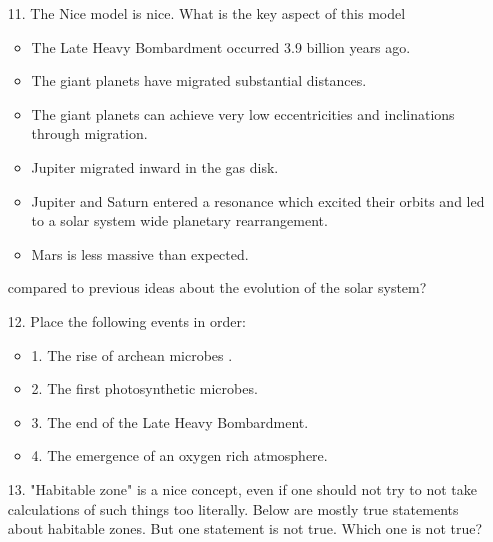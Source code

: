 \begin{enumerate}
    \item[11.] The Nice model is nice. What is the key aspect of this model 
    
    \begin{itemize}[label={$\bullet$}]
        \item The Late Heavy Bombardment occurred 3.9 billion years ago.
        \item The giant planets have migrated substantial distances.
        \item The giant planets can achieve very low eccentricities and inclinations through migration.
        \item Jupiter migrated inward in the gas disk.
        \item Jupiter and Saturn entered a resonance which excited  their orbits and led to a solar system wide planetary rearrangement.
        \item Mars is less massive than expected.
    \end{itemize}
    
    compared to previous ideas about the evolution of the solar system?
    \item[12.] Place the following events in order:

    \begin{itemize}[label={$\bullet$}]
        \item 1. The rise of archean microbes .
        \item 2. The first photosynthetic microbes.
        \item 3. The end of the Late Heavy Bombardment.
        \item 4. The emergence of an oxygen rich atmosphere.
    \end{itemize}


    \item[13.] "Habitable zone" is a nice concept, even if one should not try to not take calculations of such things too literally. Below are mostly true statements about habitable zones. But one statement is not true. Which one is not true?


\end{enumerate}
